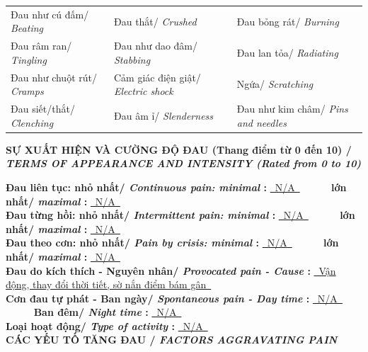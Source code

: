\documentclass[11pt,a4paper]{article}
\newcommand{\CheckBox}[2][false]{%
    \ifthenelse{\equal{#1}{true}}{%
        \makebox[0pt][l]{$\square$}\raisebox{.15ex}{\hspace{0.08em}$\checkmark$}%
    }{%
        $\square$%
    }%
    \hspace{0.12cm}#2%
}
\newcommand{\SubSectionTitle}[2]{%
    \vspace{0.08cm}
    {\bfseries #1/ \textit{#2}}\par
}
\begin{document}
\begin{tabularx}{\textwidth}{@{} X X X @{}}
    \CheckBox[false]{ Đau như cú đấm/ \textit{ Beating } }  &     \CheckBox[false]{ Đau thắt/ \textit{ Crushed } }  &     \CheckBox[false]{ Đau bỏng rát/ \textit{ Burning } }   \\[0.12cm]
    \CheckBox[false]{ Đau râm ran/ \textit{ Tingling } }  &     \CheckBox[true]{ Đau như dao đâm/ \textit{ Stabbing } }  &     \CheckBox[false]{ Đau lan tỏa/ \textit{ Radiating } }   \\[0.12cm]
    \CheckBox[false]{ Đau như chuột rút/ \textit{ Cramps } }  &     \CheckBox[false]{ Cảm giác điện giật/ \textit{ Electric shock } }  &     \CheckBox[true]{ Ngứa/ \textit{ Scratching } }   \\[0.12cm]
    \CheckBox[false]{ Đau siết/thắt/ \textit{ Clenching } }  &     \CheckBox[true]{ Đau âm ỉ/ \textit{ Slenderness } }  &     \CheckBox[false]{ Đau như kim châm/ \textit{ Pins and needles } }   \\[0.12cm]
\end{tabularx}
\SubSectionTitle{ SỰ XUẤT HIỆN VÀ CƯỜNG ĐỘ ĐAU (Thang điểm từ 0 đến 10) }{ TERMS OF APPEARANCE AND INTENSITY (Rated from 0 to 10) }

\textbf{ Đau liên tục: nhỏ nhất/ \textit{ Continuous pain: minimal }: } \underline{~N/A~} ~~~~~ \textbf{ lớn nhất/ \textit{ maximal }: } \underline{~N/A~}\\[0.12cm]
\textbf{ Đau từng hồi: nhỏ nhất/ \textit{ Intermittent pain: minimal }: } \underline{~N/A~} ~~~~~ \textbf{ lớn nhất/ \textit{ maximal }: } \underline{~N/A~}\\[0.12cm]
\textbf{ Đau theo cơn: nhỏ nhất/ \textit{ Pain by crisis: minimal }: } \underline{~N/A~} ~~~~~ \textbf{ lớn nhất/ \textit{ maximal }: } \underline{~N/A~}\\[0.12cm]
\textbf{ Đau do kích thích - Nguyên nhân/ \textit{ Provocated pain - Cause }: } \underline{~Vận động, thay đổi thời tiết, sờ nắn điểm bám gân~}\\[0.12cm]
\textbf{ Cơn đau tự phát - Ban ngày/ \textit{ Spontaneous pain - Day time }: } \underline{~N/A~} ~~~~~ \textbf{ Ban đêm/ \textit{ Night time }: } \underline{~N/A~}\\[0.12cm]
\textbf{ Loại hoạt động/ \textit{ Type of activity }: } \underline{~N/A~}\\[0.12cm]

\SubSectionTitle{ CÁC YẾU TỐ TĂNG ĐAU }{ FACTORS AGGRAVATING PAIN }
\end{document}
